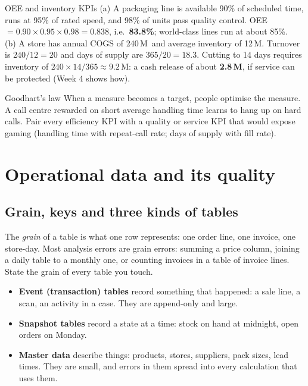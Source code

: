 \begin{example}{OEE and inventory KPIs}
(a) A packaging line is available 90\% of scheduled time, runs at 95\% of rated speed, and 98\% of units pass
quality control. OEE $=0.90\times0.95\times0.98=0.838$, i.e.\ \textbf{83.8\%}; world-class lines run at about 85\%.\\
(b) A store has annual COGS of 240\,M\xaf\ and average inventory of 12\,M\xaf. Turnover is $240/12=20$ and days of
supply are $365/20=\mathbf{18.3}$. Cutting to 14 days requires inventory of $240\times14/365\approx9.2$\,M\xaf: a cash
release of about \textbf{2.8\,M\xaf}, if service can be protected (Week 4 shows how).
\end{example}

\begin{pitfall}{Goodhart's law}
When a measure becomes a target, people optimise the measure. A call centre rewarded on short average handling time
learns to hang up on hard calls. Pair every efficiency KPI with a quality or service KPI that would expose gaming
(handling time with repeat-call rate; days of supply with fill rate).
\end{pitfall}

\section{Operational data and its quality}
\subsection{Grain, keys and three kinds of tables}
The \emph{grain} of a table is what one row represents: one order line, one invoice, one store-day. Most analysis
errors are grain errors: summing a price column, joining a daily table to a monthly one, or counting invoices in a
table of invoice lines. State the grain of every table you touch.

\begin{itemize}
\item \textbf{Event (transaction) tables} record something that happened: a sale line, a scan, an activity in a
case. They are append-only and large.
\item \textbf{Snapshot tables} record a state at a time: stock on hand at midnight, open orders on Monday.
\item \textbf{Master data} describe things: products, stores, suppliers, pack sizes, lead times. They are small, and
errors in them spread into every calculation that uses them.
\end{itemize}

